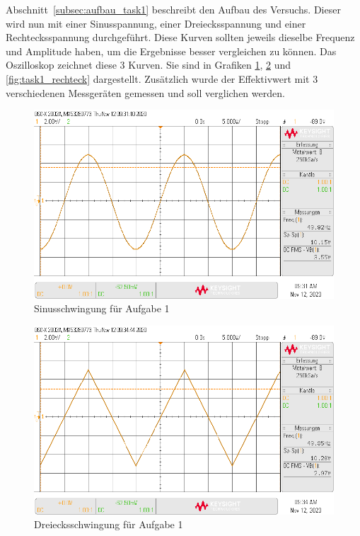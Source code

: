 \documentclass{article}
\begin{document}
Abschnitt~\ref{subsec:aufbau_task1} beschreibt den Aufbau des Versuchs. Dieser wird nun mit einer Sinusspannung, einer Dreiecksspannung und einer Rechtecksspannung durchgeführt. Diese Kurven sollten jeweils dieselbe Frequenz und Amplitude haben, um die Ergebnisse besser vergleichen zu können. Das Oszilloskop zeichnet diese 3 Kurven. Sie sind in Grafiken \ref{fig:task1_sin}, \ref{fig:task1_dreieck} und \ref{fig:task1_rechteck} dargestellt. Zusätzlich wurde der Effektivwert mit 3 verschiedenen Messgeräten gemessen und soll verglichen werden.


\begin{figure}[H]
\centering
\caption{Sinusschwingung für Aufgabe 1}
\label{fig:task1_sin}
\includegraphics[scale=0.4]{daten/pul_1.png}
\end{figure}

\begin{figure}[H]
\centering
\caption{Dreiecksschwingung für Aufgabe 1}
\label{fig:task1_dreieck}
\includegraphics[scale=0.4]{daten/pul_2.png}
\end{figure}
\end{document}
